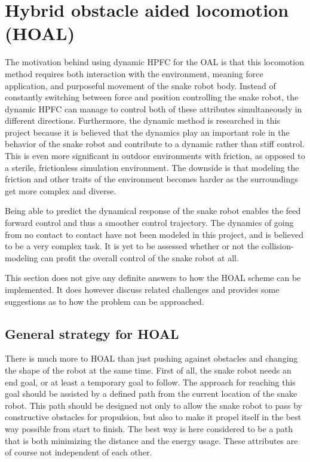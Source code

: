 \section{Hybrid obstacle aided locomotion (HOAL)}\label{sec:dhpfc-oal}

The motivation behind using dynamic HPFC for the OAL is that this locomotion method requires both interaction with the environment, meaning force application, and purposeful movement of the snake robot body. Instead of constantly switching between force and position controlling the snake robot, the dynamic HPFC can manage to control both of these attributes simultaneously in different directions. Furthermore, the dynamic method is researched in this project because it is believed that the dynamics play an important role in the behavior of the snake robot and contribute to a dynamic rather than stiff control. This is even more significant in outdoor environments with friction, as opposed to a sterile, frictionless simulation environment. The downside is that modeling the friction and other traits of the environment becomes harder as the surroundings get more complex and diverse.

Being able to predict the dynamical response of the snake robot enables the feed forward control and thus a smoother control trajectory. 
The dynamics of going from no contact to contact have not been modeled in this project, and is believed to be a very complex task. It is yet to be assessed whether or not the collision-modeling can profit the overall control of the snake robot at all.

This section does not give any definite answers to how the HOAL scheme can be implemented. It does however discuss related challenges and provides some suggestions as to how the problem can be approached.

\subsection{General strategy for HOAL}

There is much more to HOAL than just pushing against obstacles and changing the shape of the robot at the same time. First of all, the snake robot needs an end goal, or at least a temporary goal to follow. The approach for reaching this goal should be assisted by a defined path from the current location of the snake robot. This path should be designed not only to allow the snake robot to pass by constructive obstacles for propulsion, but also to make it propel itself in the best way possible from start to finish. The best way is here considered to be a path that is both minimizing the distance and the energy usage. These attributes are of course not independent of each other.

